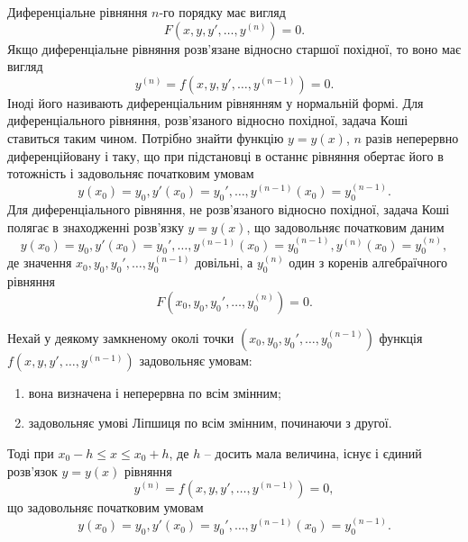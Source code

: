 Диференціальне рівняння $n$-го порядку має вигляд
\begin{equation*}
	F \left( x, y, y', \ldots, y^{(n)} \right) = 0.
\end{equation*}
Якщо диференціальне рівняння розв’язане відносно старшої похідної, то воно має вигляд
\begin{equation*}
	y^{(n)} = f \left( x, y, y', \ldots, y^{(n-1)} \right) = 0.
\end{equation*}
Іноді його називають диференціальним рівнянням у нормальній формі. Для диференціального рівняння, розв’язаного відносно похідної, задача Коші ставиться таким чином. Потрібно знайти функцію $y = y(x)$, $n$ разів неперервно диференційовану і таку, що при підстановці в останнє рівняння обертає його в тотожність і задовольняє початковим умовам 
\begin{equation*}
	y(x_0) = y_0, y'(x_0) = y_0', \ldots, y^{(n - 1)} (x_0) = y_0^{(n-1)}.
\end{equation*}
Для диференціального рівняння, не розв’язаного відносно похідної, задача Коші полягає в знаходженні розв’язку $y = y(x)$, що задовольняє початковим даним 
\begin{equation*}
	y(x_0) = y_0, y'(x_0) = y_0', \ldots, y^{(n - 1)} (x_0) = y_0^{(n-1)}, y^{(n)} (x_0) = y_0^{(n)},
\end{equation*}
де значення $x_0, y_0, y_0', \ldots, y_0^{(n-1)}$ довільні, а $y_0^{(n)}$ один з коренів алгебраїчного рівняння 
\begin{equation*}
	F \left( x_0, y_0, y_0', \ldots, y_0^{(n)} \right) = 0.
\end{equation*}

\begin{theorem}
	Нехай у деякому замкненому околі точки $\left(x_0, y_0, y_0', \ldots, y_0^{(n-1)}\right)$ функція $f\left(x,y,y',\ldots,y^{(n-1)}\right)$ задовольняє умовам:
	\begin{enumerate}
		\item вона визначена і неперервна по всім змінним;
		\item задовольняє умові Ліпшиця по всім змінним, починаючи з другої.
	\end{enumerate}
	Тоді при $x_0 - h \le x \le x_0 + h$, де $h$ -- досить мала величина, існує і єдиний розв’язок $y=y(x)$ рівняння
		\begin{equation*}
		y^{(n)} = f \left( x, y, y', \ldots, y^{(n-1)} \right) = 0,
	\end{equation*}
	що задовольняє початковим умовам 
	\begin{equation*}
		y(x_0) = y_0, y'(x_0) = y_0', \ldots, y^{(n - 1)} (x_0) = y_0^{(n-1)}.
	\end{equation*}
\end{theorem}

